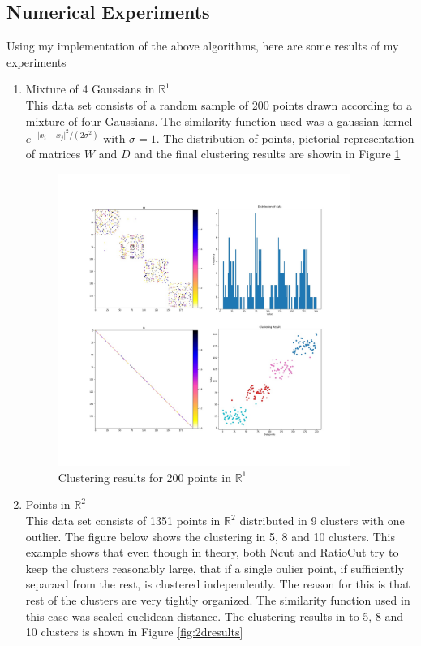 \documentclass[10pt,a4paper, nocenter]{report}
\newcommand{\abs}[1]{\lvert {#1} \rvert}
\begin{document}
    \subsection{Numerical Experiments}

    Using my implementation of the above algorithms, here are some results of my experiments

    \begin{enumerate}
        \item{Mixture of 4 Gaussians in $\mathbb{R}^1$}\\
        This data set consists of a random sample of 200 points drawn according to a mixture of four Gaussians. The similarity function used was a gaussian kernel $e^{-\abs{x_i - x_j}^2/(2\sigma^2)}$ with $\sigma = 1$. The distribution of points, pictorial representation of matrices $W$ and $D$ and the final clustering results are showin in Figure \ref{fig:1dresults}

        \begin{figure}
        \includegraphics[width=0.9\textwidth]{../../1DCluster.jpg}
        \caption{Clustering results for 200 points in $\mathbb{R}^1$}
        \label{fig:1dresults}
        \end{figure}

        \item{Points in $\mathbb{R}^2$}\\
        This data set consists of 1351 points in $\mathbb{R}^2$ distributed in 9 clusters with one outlier. The figure below shows the clustering in 5, 8 and 10 clusters. This example shows that even though in theory, both Ncut and RatioCut try to keep the clusters reasonably large, that if a single oulier point, if sufficiently separaed from the rest, is clustered independently. The reason for this is that rest of the clusters are very tightly organized. The similarity function used in this case was scaled euclidean distance. The clustering results in to 5, 8 and 10 clusters is shown in Figure \ref{fig:2dresults}


\end{enumerate}
\end{document}
